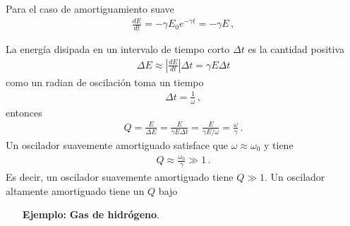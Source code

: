 Para el caso de amortiguamiento suave
\begin{align*}
  \frac{dE}{dt}=-\gamma E_0 e^{-\gamma t}=-\gamma E\,,
\end{align*}

La energía disipada en un intervalo de tiempo corto $\Delta t$ es la cantidad positiva
\begin{align*}
  \Delta E\approx\left|\frac{d E}{d t}\right|\Delta t=\gamma E \Delta t
\end{align*}
como un radian de oscilación toma un tiempo
\begin{align*}
  \Delta t=\frac{1}{\omega}\,,
\end{align*}
entonces
\begin{align}
  \label{eq:calidad}
  Q=\frac{E}{\Delta E}=\frac{E}{\gamma E \Delta t}=\frac{E}{\gamma E/\omega}=\frac{\omega}{\gamma}\,.
\end{align}
Un oscilador suavemente amortiguado satisface que $\omega\approx\omega_0$ y tiene
\begin{align*}
 Q \approx \frac{\omega_0}{\gamma}\gg 1\,.
\end{align*}
Es decir, un oscilador suavemente amortiguado tiene $Q\gg 1$. Un oscilador altamente amortiguado tiene un $Q$ bajo

\begin{itemize}
\item[\textbf{Ejemplo:}] \textbf{Gas de hidrógeno}. 
\end{itemize}

